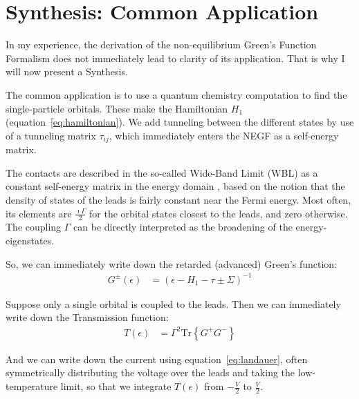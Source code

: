 \section{Synthesis: Common Application}
\label{sec:synthesis}


In my experience, the derivation of the non-equilibrium Green's Function Formalism does not immediately lead to clarity of its application. That is why I will now present a Synthesis.

The common application is to use a quantum chemistry computation to find the single-particle orbitals. These make the Hamiltonian $H_1$ (equation~\ref{eq:hamiltonian}). We add tunneling between the different states by use of a tunneling matrix $\tau_{ij}$, which immediately enters the NEGF as a self-energy matrix. 

The contacts are described in the so-called Wide-Band Limit (WBL) as a constant self-energy matrix in the energy domain \cite{wbl}, based on the notion that the density of states of the leads is fairly constant near the Fermi energy. Most often, its elements are $\frac{\imath \Gamma}{2}$ for the orbital states closest to the leads, and zero otherwise. The coupling $\Gamma$ can be directly interpreted as the broadening of the energy-eigenstates.

So, we can immediately write down the retarded (advanced) Green's function:
\begin{align}
G^\pm(\epsilon) &= \left(\epsilon - H_1 - \tau \pm \Sigma\right)^{-1}
\label{eq:commongf}
\end{align}

Suppose only a single orbital is coupled to the leads. Then we can immediately write down the Transmission function:
\begin{align}
T(\epsilon) &= \Gamma^2\text{Tr}\left\{G^+ G^-\right\}
\label{eq:commonte}
\end{align}

And we can write down the current using equation~\ref{eq:landauer}, often symmetrically distributing the voltage over the leads and taking the low-temperature limit, so that we integrate $T(\epsilon)$ from $-\frac{V}{2}$ to $\frac{V}{2}$. 



